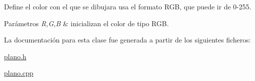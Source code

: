 Define el color con el que se dibujara usa el formato R\+GB, que puede ir de 0-\/255. 
\begin{DoxyParams}{Parámetros}
{\em R,G,B} & inicializan el color de tipo R\+GB. \\
\hline
\end{DoxyParams}


La documentación para esta clase fue generada a partir de los siguientes ficheros\+:\begin{DoxyCompactItemize}
\item 
\hyperlink{plano_8h}{plano.\+h}\item 
\hyperlink{plano_8cpp}{plano.\+cpp}\end{DoxyCompactItemize}
